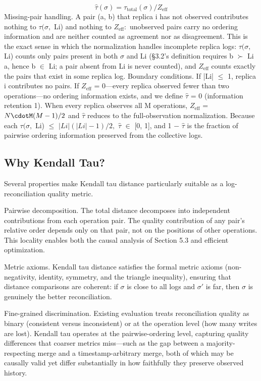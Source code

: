 \documentclass[10pt,twocolumn]{article}
\begin{document}
\[ \hat{\tau}(\sigma) = \tau_{\mathrm{total}}(\sigma) / Z_{\mathrm{eff}} \]
Missing-pair handling. A pair (a, b) that replica i has not observed contributes nothing to $\tau(\sigma,$ Li) and nothing to $Z_{\mathrm{eff}}:$ unobserved pairs carry no ordering information and are neither counted as agreement nor as disagreement. This is the exact sense in which the normalization handles incomplete replica logs: $\tau(\sigma,$ Li) counts only pairs present in both $\sigma$ and Li (§3.2's definition requires b $\succ$ Li a, hence b $\in$ Li; a pair absent from Li is never counted), and $Z_{\mathrm{eff}}$ counts exactly the pairs that exist in some replica log. Boundary conditions. If |Li| $\leq$ 1, replica i contributes no pairs. If $Z_{\mathrm{eff}}$ = 0—every replica observed fewer than two operations—no ordering information exists, and we define $\hat{\tau}$ = 0 (information retention 1). When every replica observes all M operations, $Z_{\mathrm{eff}}$ = $N\cdotM(M-1)/2$ and $\hat{\tau}$ reduces to the full-observation normalization. Because each $\tau(\sigma,$ Li) $\leq$ $|Li|(|Li|-1)/2,$ $\hat{\tau}$ $\in$ [0, 1], and 1 $-$ $\hat{\tau}$ is the fraction of pairwise ordering information preserved from the collective logs.

\subsection{Why Kendall Tau?}
Several properties make Kendall tau distance particularly suitable as a log-reconciliation quality metric.

Pairwise decomposition. The total distance decomposes into independent contributions from each operation pair. The quality contribution of any pair's relative order depends only on that pair, not on the positions of other operations. This locality enables both the causal analysis of Section 5.3 and efficient optimization.

Metric axioms. Kendall tau distance satisfies the formal metric axioms (non-negativity, identity, symmetry, and the triangle inequality), ensuring that distance comparisons are coherent: if $\sigma$ is close to all logs and $\sigma′$ is far, then $\sigma$ is genuinely the better reconciliation.

Fine-grained discrimination. Existing evaluation treats reconciliation quality as binary (consistent versus inconsistent) or at the operation level (how many writes are lost). Kendall tau operates at the pairwise-ordering level, capturing quality differences that coarser metrics miss—such as the gap between a majority-respecting merge and a timestamp-arbitrary merge, both of which may be causally valid yet differ substantially in how faithfully they preserve observed history.
\end{document}
